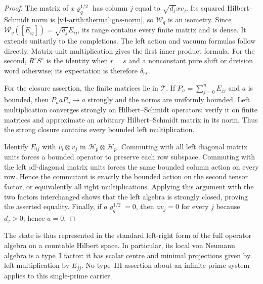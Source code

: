 \begin{proof}
The matrix of $x\varrho_q^{1/2}$ has column $j$ equal to
$\sqrt{d_j}xv_j$. Its squared Hilbert--Schmidt norm is
\eqref{v4-arith:thermal:gns-norm}, so $\mathcal W_q$ is an
isometry. Since $\mathcal W_q([E_{ij}])=\sqrt{d_j}E_{ij}$,
its range contains every finite matrix and is dense. It extends
unitarily to the completions. The left action and vacuum formulas
follow directly. Matrix-unit multiplication gives the first inner
product formula. For the second, $R^rS^s$ is the identity when
$r=s$ and a nonconstant pure shift or division word otherwise;
its expectation is therefore $\delta_{rs}$.

For the closure assertion, the finite matrices lie in $\mathcal T$.
If $P_n=\sum_{j=0}^nE_{jj}$ and $a$ is bounded, then
$P_naP_n\to a$ strongly and the norms are uniformly bounded.
Left multiplication converges strongly on Hilbert--Schmidt
operators: verify it on finite matrices and approximate an
arbitrary Hilbert--Schmidt matrix in its norm. Thus the strong
closure contains every bounded left multiplication.

Identify $E_{ij}$ with $v_i\otimes\overline{v_j}$ in
$\mathscr H_p\otimes\overline{\mathscr H_p}$. Commuting with
all left diagonal matrix units forces a bounded operator to
preserve each row subspace. Commuting with the left off-diagonal
matrix units forces the same bounded column action on every
row. Hence the commutant is exactly the bounded action on the
second tensor factor, or equivalently all right multiplications.
Applying this argument with the two factors interchanged shows
that the left algebra is strongly closed, proving the asserted
equality. Finally, if $a\varrho_q^{1/2}=0$, then $av_j=0$ for
every $j$ because $d_j>0$; hence $a=0$.
\end{proof}

The state is thus represented in the standard left-right form
of the full operator algebra on a countable Hilbert space.
In particular, its local von Neumann algebra is a type~I factor:
it has scalar centre and minimal projections given by left
multiplication by $E_{jj}$. No type~III assertion about an
infinite-prime system applies to this single-prime carrier.

